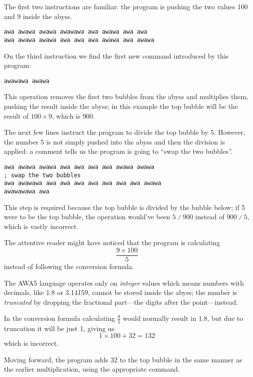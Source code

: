 \documentclass[11pt,a4paper,draft]{book}
\begin{document}
The first two instructions are familiar: the program is pushing the
two values 100 and 9 inside the abyss.

\begin{verbatim}
awa awawa awawa awawawa awa awawa awa awa
awa awawa awawa awa awa awa awawa awa awawa
\end{verbatim}

On the third instruction we find the first new command introduced by
this program:

\begin{verbatim}
awawawa awawa
\end{verbatim}

This operation removes the first two bubbles from the
abyss and multiplies them, pushing the result inside the abyss; in
this example the top bubble will be the result of \(100 \times 9\),
which is 900.

The next few lines instruct the program to divide the top bubble by
5. However, the number 5 is not simply pushed into the abyss and then
the division is applied: a comment tells us the program is going to
\enquote{swap the two bubbles}.

\begin{verbatim}
awa awawa awawa awa awa awa awa awawa awawa
; swap the two bubbles
awa awawawa awa awa awa awa awa awa awa awawa
awawawawa awa
\end{verbatim}

This step is required because the top bubble is divided by the bubble
below; if 5 were to be the top bubble, the operation would've been \(5
\divslash 900\) instead of \(900 \divslash 5\), which is vastly
incorrect.

The attentive reader might have noticed that the program is
calculating \[\frac{9 \times 100}{5}\] instead of following the
conversion formula.

The AWA5 language operates only on \emph{integer} values which means
numbers with decimals, like \num{1.8} or \num{3.14159}, cannot be
stored inside the abyss; the number is \emph{truncated} by dropping
the fractional part---the digits after the point---instead.

In the conversion formula calculating \(\frac{9}{5}\) would normally
result in \num{1.8}, but due to truncation it will be just 1, giving
us \[1 \times 100 + 32 = 132\] which is incorrect.

Moving forward, the program adds 32 to the top bubble in the same
manner as the earlier multiplication, using the appropriate
command.
\end{document}
